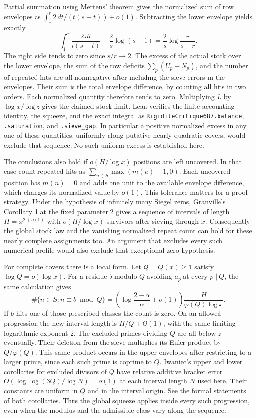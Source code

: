 \documentclass[11pt]{article}
\begin{document}
Partial summation using Mertens' theorem gives the normalized sum of
row envelopes as $\int_1^r 2\,dt/(t(s-t))+o(1)$. Subtracting the
lower envelope yields exactly
\[
 \int_1^r \frac{2\,dt}{t(s-t)}
       -\frac2s\log(s-1)=\frac2s\log\frac{r}{s-r}.
\]
The right side tends to zero since $s/r\to2$. The excess of the
actual stock over the lower envelope, the sum of the row deficits
$\sum_p(U_p-N_p)$, and the number of repeated hits are all
nonnegative after including the sieve errors in the envelopes.
Their sum is the total envelope difference, by counting all hits in
two orders. Each normalized quantity therefore tends to zero.
Multiplying $L$ by $\log x/\log z$ gives the claimed stock limit.
Lean verifies the finite accounting identity, the squeeze, and the
exact integral as \texttt{RigiditeCritique687.balance},
\texttt{.saturation}, and \texttt{.sieve\_gap}.
In particular a positive normalized excess in any one of these
quantities, uniformly along putative nearly quadratic covers, would
exclude that sequence. No such uniform excess is established here.

The conclusions also hold if $o(H/\log x)$ positions are left
uncovered. In that case count repeated hits as
$\sum_{n\in S}\max(m(n)-1,0)$. Each uncovered position has $m(n)=0$
and adds one unit to the available envelope difference, which
changes its normalized value by $o(1)$.
This tolerance matters for a proof strategy. Under the hypothesis of
infinitely many Siegel zeros, Granville's Corollary 1 at the fixed
parameter $2$ gives a sequence of intervals of length $H=x^{2+o(1)}$
with $o(H/\log x)$ survivors after sieving through $x$.
Consequently the global stock law and the vanishing normalized
repeat count can hold for these nearly complete assignments too.
An argument that excludes every such numerical profile would also
exclude that exceptional-zero hypothesis.

For complete covers there is a local form. Let $Q=Q(x)\ge1$ satisfy
$\log Q=o(\log x)$. For a residue $b$ modulo $Q$ avoiding $a_p$
at every $p\mid Q$, the same calculation gives
\[
 \#\{n\in S:n\equiv b\bmod Q\}
   =\left(\log\frac{2-\alpha}{\alpha}+o(1)\right)
       \frac{H}{\varphi(Q)\log x}.
\]
If $b$ hits one of those prescribed classes the count is zero. On an
allowed progression the new interval length is $H/Q+O(1)$, with
the same limiting logarithmic exponent $2$. The excluded primes
dividing $Q$ are all below $z$ eventually. Their deletion from
the sieve multiplies its Euler product by $Q/\varphi(Q)$.
This same product occurs in the upper envelopes after restricting
to a larger prime, since each such prime is coprime to $Q$.
Iwaniec's upper and lower corollaries for excluded divisors of $Q$
have relative additive bracket error
$O(\log\log(3Q)/\log N)=o(1)$ at each interval length $N$ used here.
Their constants are uniform in $Q$ and in the interval origin.
See the \href{https://github.com/jasondavies/iwaniec-linear-sieve/blob/84dfeff69393f31bbdcd126531f0ad8976069dad/IwaniecLinearSieve/Main/Corollary.lean}{formal statements of both corollaries}.
Thus the global squeeze applies inside every such progression, even
when the modulus and the admissible class vary along the sequence.
\end{document}
